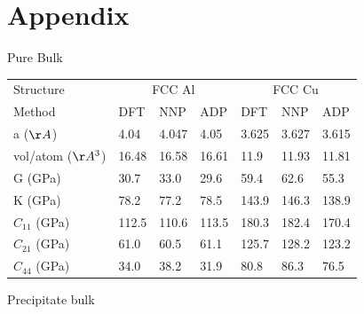 \documentclass{article}
\begin{document}
%
\section{Appendix \newline%
}%
\label{sec:Appendix}%
Pure Bulk \newline%
%
\begin{tabular}{l|lll|lll}%
\hline%
Structure&\multicolumn{3}{c}{FCC Al}&\multicolumn{3}{c}{FCC Cu}\\%
Method&DFT&NNP&ADP&DFT&NNP&ADP\\%
\hline%
a ($\AA$)&4.04&4.047&4.05&3.625&3.627&3.615\\%
vol/atom ($\AA^3$)&16.48&16.58&16.61&11.9&11.93&11.81\\%
G (GPa)&30.7&33.0&29.6&59.4&62.6&55.3\\%
K (GPa)&78.2&77.2&78.5&143.9&146.3&138.9\\%
$C_{11}$ (GPa)&112.5&110.6&113.5&180.3&182.4&170.4\\%
$C_{21}$ (GPa)&61.0&60.5&61.1&125.7&128.2&123.2\\%
$C_{44}$ (GPa)&34.0&38.2&31.9&80.8&86.3&76.5\\%
\hline%
\end{tabular}%
\newline%
\newline%
\newline%
\newline%
%
Precipitate bulk \newline%
%
\end{document}
